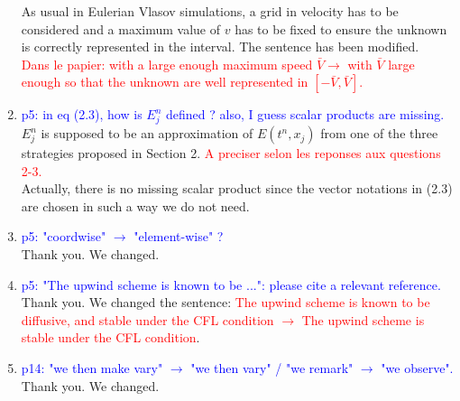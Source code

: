 \documentclass{article}
\begin{document}
\begin{enumerate}
        As usual in Eulerian Vlasov simulations, a grid in velocity has to be considered and a maximum value of $v$ has to be fixed 
        to ensure the unknown is correctly represented in the interval. The sentence has been modified. \\
        \textcolor{red}{Dans le papier: with a large enough maximum speed $\bar{V} \to$  with $\bar{V}$ large enough so that the unknown are well represented in 
        $[-\bar{V}, \bar{V}]$. }
        \item \textcolor{blue}{p5: in eq (2.3), how is $E^n_j$ defined ? also, I guess scalar products are missing. }\\ 
$E^n_j$ is supposed to be an approximation of $E(t^n, x_j)$ from one of the three strategies proposed in Section 2.  \textcolor{red}{A preciser selon les reponses aux questions 2-3.} 
\\
Actually, there is no missing scalar product since the vector notations in (2.3) are chosen in such a way we do not need.  
\item \textcolor{blue}{p5: "coordwise" $\to$ "element-wise" ?}\\
        Thank you. We changed. 
\item \textcolor{blue}{p5: "The upwind scheme is known to be ...": please cite a relevant reference. }\\ 
      Thank you. We changed the sentence: \textcolor{red}{ The upwind scheme is known to be diffusive, and stable under the CFL condition $\to$ The upwind scheme is stable under the CFL condition}. 
\item \textcolor{blue}{p14: "we then make vary" $\to$ "we then vary" / "we remark" $\to$ "we observe". }\\
       Thank you. We changed. 
\end{enumerate}

%
%
\end{document}
